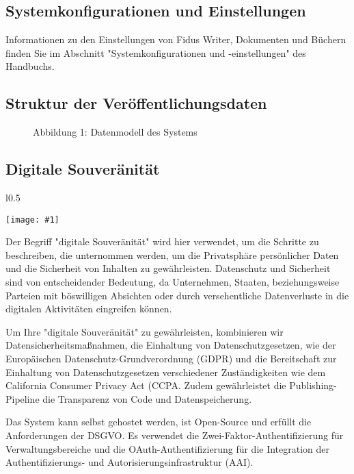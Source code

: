 \documentclass{article}
\newlength{\imgwidth}
\newcommand\scaledgraphics[2]{%
                
\settowidth{\imgwidth}{\texttt{[image: \#1]}}%
                
\setlength{\imgwidth}{\minof{\imgwidth}{#2\textwidth}}%
                
\texttt{[image: \#1]}%
                
}
\begin{document}
\subsection{Systemkonfigurationen und Einstellungen}\label{H1641086}



Informationen zu den Einstellungen von Fidus Writer, Dokumenten und Büchern finden Sie im Abschnitt "Systemkonfigurationen und -einstellungen" des Handbuchs.


\subsection{Struktur der Veröffentlichungsdaten}\label{H4187554}


\begin{figure}

\caption*{Abbildung 1: Datenmodell des Systems}\label{F86281041}
\end{figure}


\subsection{Digitale Souveränität}\label{H6425485}


\begin{wrapfigure}{l}{0.5\textwidth}
\scaledgraphics{60a0cd01-c4e1-467e-a517-a5ae77dbbbaf.png}{0.5}
\label{F43863211}
\end{wrapfigure}


Der Begriff "digitale Souveränität" wird hier verwendet, um die Schritte zu beschreiben, die unternommen werden, um die Privatsphäre persönlicher Daten und die Sicherheit von Inhalten zu gewährleisten. Datenschutz und Sicherheit sind von entscheidender Bedeutung, da Unternehmen, Staaten, beziehungsweise Parteien mit böswilligen Absichten oder durch versehentliche Datenverluste in die digitalen Aktivitäten eingreifen können.


Um Ihre "digitale Souveränität" zu gewährleisten, kombinieren wir Datensicherheitsmaßnahmen, die Einhaltung von Datenschutzgesetzen, wie der Europäischen Datenschutz-Grundverordnung (GDPR) und die Bereitschaft zur Einhaltung von Datenschutzgesetzen verschiedener Zuständigkeiten wie dem California Consumer Privacy Act (CCPA. Zudem gewährleistet die Publishing-Pipeline die Transparenz von Code und Datenspeicherung.


Das System kann selbst gehostet werden, ist Open-Source und erfüllt die Anforderungen der DSGVO. Es verwendet die Zwei-Faktor-Authentifizierung für Verwaltungsbereiche und die OAuth-Authentifizierung für die Integration der Authentifizierungs- und Autorisierungsinfrastruktur (AAI).
\end{document}
